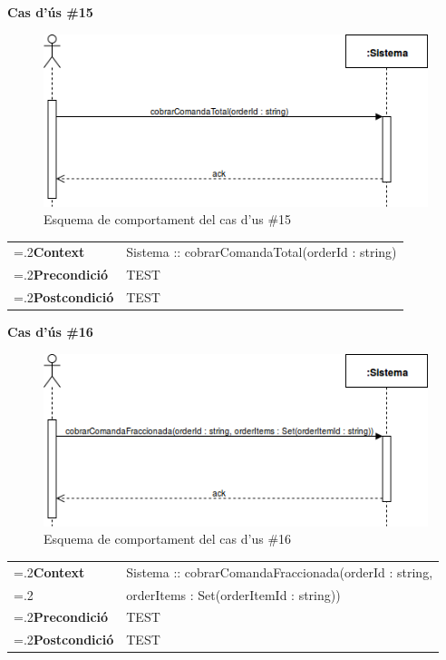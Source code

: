 \clearpage
\noindent\textbf{\large Cas d'ús \#15}\\
\begin{figure}[H]
\centering
\includegraphics[scale=0.6]{Figures/casdus_15.png}
\caption{Esquema de comportament del cas d'us \#15}
\end{figure}
\begin{table}[h]
\noindent
\begin{tabularx}{\linewidth}{
>{\hsize=.2\hsize}X%
>{\hsize=0.8\hsize}X%
}
\textbf{Context} 		& Sistema :: cobrarComandaTotal(orderId : string) \\
\textbf{Precondició} 	& TEST \\
\textbf{Postcondició}	& TEST \\
\end{tabularx}
\label{}
\end{table}

\noindent\textbf{\large Cas d'ús \#16}\\
\begin{figure}[H]
\centering
\includegraphics[scale=0.6]{Figures/casdus_16.png}
\caption{Esquema de comportament del cas d'us \#16}
\end{figure}
\begin{table}[h]
\noindent
\begin{tabularx}{\linewidth}{
>{\hsize=.2\hsize}X%
>{\hsize=0.8\hsize}X%
}
\textbf{Context} 		& Sistema :: cobrarComandaFraccionada(orderId : string,\\
						& orderItems : Set(orderItemId : string)) \\
\textbf{Precondició} 	& TEST \\
\textbf{Postcondició}	& TEST \\
\end{tabularx}
\label{}
\end{table}


